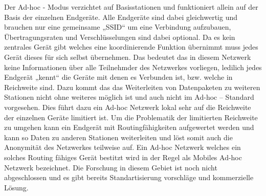 \documentclass[a4paper,13pt]{scrartcl}
\begin{document}
Der Ad-hoc - Modus verzichtet auf Basisstationen und funktioniert allein auf der Basis der einzelnen Endgeräte. Alle Endgeräte sind dabei gleichwertig und brauchen nur eine gemeinsame „SSID“ um eine Verbindung aufzubauen, Übertragungsraten und Verschlüsselungen sind dabei optional. Da es kein zentrales Gerät gibt welches eine koordinierende Funktion übernimmt muss jedes Gerät dieses für sich selbst übernehmen. Das bedeutet das in diesem Netzwerk keine Informationen über alle Teilnehmder des Netzwerkes vorliegen, ledilich jedes Endgerät „kennt“ die Geräte mit denen es Verbunden ist, bzw. welche in Reichweite sind. Dazu kommt das das Weiterleiten von Datenpaketen zu weiteren Stationen nicht ohne weiteres möglich ist und auch nicht im Ad-hoc – Standard vorgesehen. Dies führt dazu ein Ad-hoc Netzwerk lokal sehr auf die Reichweite der einzelnen Geräte limitiert ist. Um die Problematik der limitierten Reichweite zu umgehen kann ein Endgerät mit Routingfähigkeiten aufgewertet werden und kann so Daten zu anderen Stationen weiterleiten und löst somit auch die Anonymität des Netzwerkes teilweise auf. 
Ein Ad-hoc Netzwerk welches ein solches Routing fähiges Gerät bestitzt wird in der Regel als Mobiles Ad-hoc Netzwerk bezeichnet. Die Forschung in diesem Gebiet ist noch nicht abgeschlossen und es gibt bereits Standartisierung vorschläge und kommerzielle Lösung.

\clearpage
\end{document}
